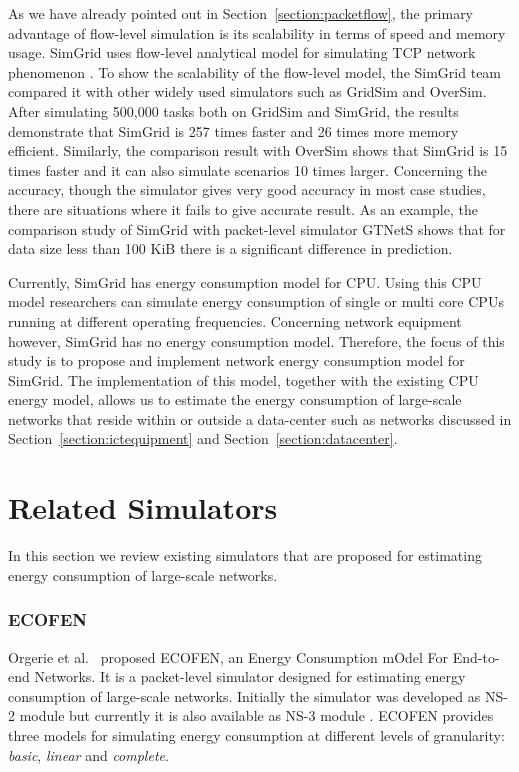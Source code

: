 As we have already pointed out in Section~\ref{section:packetflow}, the primary advantage of flow-level simulation is its scalability in terms of speed and memory usage. SimGrid uses flow-level analytical model for simulating TCP network phenomenon \cite{DBLP:journals/jpdc/CasanovaGLQS14}. To show the scalability of the flow-level model, the SimGrid team compared it with other widely used simulators such as GridSim and OverSim. After simulating 500,000 tasks both on GridSim and SimGrid, the results demonstrate that SimGrid is 257 times faster and 26 times more memory efficient. Similarly, the comparison result with OverSim shows that SimGrid is 15 times faster and it can also simulate scenarios 10 times larger. Concerning the accuracy, though the simulator gives very good accuracy in most case studies, there are situations where it fails to give accurate result. As an example, the comparison study of SimGrid with packet-level simulator GTNetS shows that for data size less than 100 KiB there is a significant difference in prediction. 

Currently, SimGrid has energy consumption model for CPU. Using this CPU model researchers can simulate energy consumption of single or multi core CPUs running at different operating frequencies. Concerning network equipment however, SimGrid has no energy consumption model. Therefore, the focus of this study is to propose and implement network energy consumption model for SimGrid. The implementation of this model, together with the existing CPU energy model, allows us to estimate the energy consumption of large-scale networks that reside within or outside a data-center such as networks discussed in Section~\ref{section:ictequipment} and Section~\ref{section:datacenter}.

\section{Related Simulators}
\label{section:relatedsimulator} 
In this section we review existing simulators that are proposed for estimating energy consumption of large-scale networks. 
\subsubsection{ECOFEN}
\label{subsection:ecofen} 
Orgerie et al.{\ }\cite{DBLP:conf/wowmom/OrgerieLLL11} proposed ECOFEN, an Energy Consumption
mOdel For End-to-end Networks. It is a packet-level simulator designed for estimating energy consumption of large-scale networks. Initially the simulator was developed as NS-2 module but currently it is also available as NS-3 module \cite{DBLP:conf/cloudnet/CorneaOL14}. ECOFEN provides three models for simulating energy consumption at different levels of granularity: \emph{basic}, \emph{linear} and \emph{complete}.

